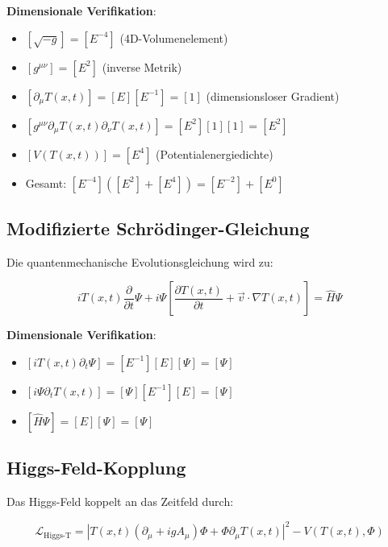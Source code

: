 \documentclass[12pt,a4paper]{article}
\newcommand{\Tfield}{T(x,t)}
\newcommand{\DhiggsT}{\Tfield (\partial_\mu + ig A_\mu) \Phi + \Phi \partial_\mu \Tfield}
\theoremstyle{definition}
\theoremstyle{remark}
\begin{document}
	\textbf{Dimensionale Verifikation}:
	\begin{itemize}
		\item $[\sqrt{-g}] = [E^{-4}]$ (4D-Volumenelement)
		\item $[g^{\mu\nu}] = [E^2]$ (inverse Metrik)
		\item $[\partial_\mu \Tfield] = [E][E^{-1}] = [1]$ (dimensionsloser Gradient)
		\item $[g^{\mu\nu} \partial_\mu \Tfield \partial_\nu \Tfield] = [E^2][1][1] = [E^2]$
		\item $[V(\Tfield)] = [E^4]$ (Potentialenergiedichte)
		\item Gesamt: $[E^{-4}]([E^2] + [E^4]) = [E^{-2}] + [E^0]$ \checkmark
	\end{itemize}
	
	\subsection{Modifizierte Schrödinger-Gleichung}
	\label{subsec:modifizierte_schroedinger}
	
	Die quantenmechanische Evolutionsgleichung wird zu:
	
	\begin{equation}
		i \Tfield \frac{\partial}{\partial t} \Psi + i \Psi \left[\frac{\partial \Tfield}{\partial t} + \vec{v} \cdot \nabla \Tfield\right] = \hat{H} \Psi
		\label{eq:modifizierte_schroedinger}
	\end{equation}
	
	\textbf{Dimensionale Verifikation}:
	\begin{itemize}
		\item $[i \Tfield \partial_t \Psi] = [E^{-1}][E][\Psi] = [\Psi]$
		\item $[i \Psi \partial_t \Tfield] = [\Psi][E^{-1}][E] = [\Psi]$
		\item $[\hat{H} \Psi] = [E][\Psi] = [\Psi]$ \checkmark
	\end{itemize}
	
	\subsection{Higgs-Feld-Kopplung}
	\label{subsec:higgs_kopplung}
	
	Das Higgs-Feld koppelt an das Zeitfeld durch:
	
	\begin{equation}
		\mathcal{L}_{\text{Higgs-T}} = |\DhiggsT|^2 - V(\Tfield, \Phi)
		\label{eq:higgs_zeit_kopplung}
	\end{equation}
	
\end{document}

